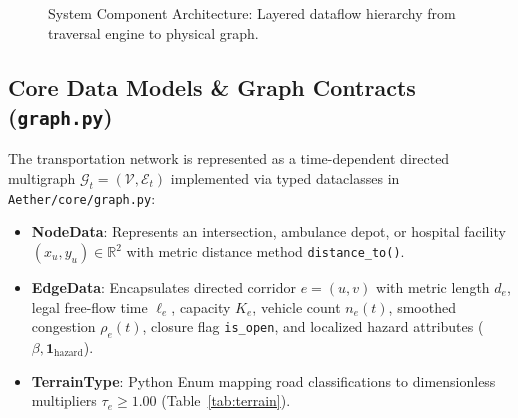 \documentclass[10pt,a4paper]{article}
\begin{document}
\begin{figure}[H]
\caption{System Component Architecture: Layered dataflow hierarchy from traversal engine to physical graph.}
\label{fig:architecture}
\end{figure}

\newpage
\subsection{Core Data Models \& Graph Contracts (\texttt{graph.py})}
The transportation network is represented as a time-dependent directed multigraph $\mathcal{G}_t = (\mathcal{V}, \mathcal{E}_t)$ implemented via typed dataclasses in \texttt{Aether/core/graph.py}:
\begin{itemize}\setlength{\itemsep}{1.5pt}\setlength{\topsep}{1pt}
  \item \textbf{NodeData}: Represents an intersection, ambulance depot, or hospital facility $(x_u, y_u) \in \mathbb{R}^2$ with metric distance method \texttt{distance\_to()}.
  \item \textbf{EdgeData}: Encapsulates directed corridor $e = (u, v)$ with metric length $d_e$, legal free-flow time $\ell_e$, capacity $K_e$, vehicle count $n_e(t)$, smoothed congestion $\rho_e(t)$, closure flag \texttt{is\_open}, and localized hazard attributes ($\beta, \mathbf{1}_{\text{hazard}}$).
  \item \textbf{TerrainType}: Python Enum mapping road classifications to dimensionless multipliers $\tau_e \ge 1.00$ (Table~\ref{tab:terrain}).
\end{itemize}
\end{document}
